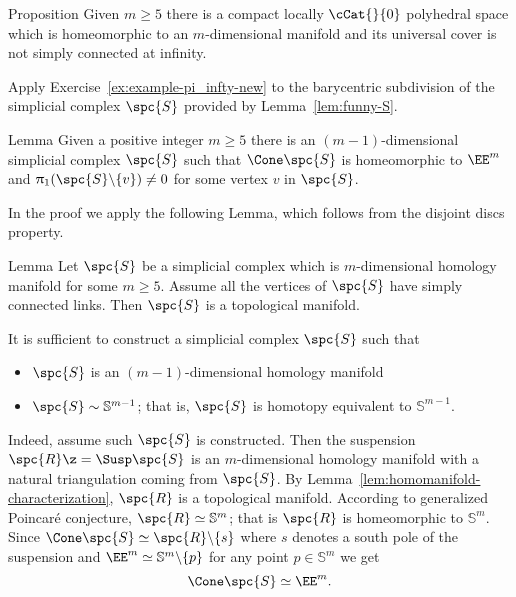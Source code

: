 \begin{thm}{Proposition}\label{prop:loc-CAT-mnfld}
Given $m\ge 5$ there is a compact locally $\cCat{}{0}$ polyhedral space which is homeomorphic to an $m$-dimensional manifold and
its universal cover is not simply connected at infinity.

\end{thm}

Apply Exercise~\ref{ex:example-pi_infty-new} to the barycentric subdivision of the simplicial complex $\spc{S}$ provided by Lemma~\ref{lem:funny-S}.
\qeds

\begin{thm}{Lemma}\label{lem:funny-S}
Given a positive integer $m\ge 5$
there is an $(m-1)$-dimensional simplicial complex $\spc{S}$ such that $\Cone\spc{S}$ is homeomorphic to $\EE^m$
and $\pi_1(\spc{S}\backslash\{v\})\ne0$ for some vertex $v$ in $\spc{S}$.
\end{thm}

In the proof we apply the following Lemma, which follows from the disjoint discs property.

\begin{thm}{Lemma}\label{lem:homomanifold-characterization}
Let $\spc{S}$ be a simplicial complex which 
is $m$-dimensional homology manifold for some $m\ge 5$.
Assume all the vertices of
$\spc{S}$ have simply connected links.
Then $\spc{S}$ is a topological manifold.
\end{thm}


It is sufficient to construct a simplicial complex $\spc{S}$
such that 
\begin{itemize}
\item $\spc{S}$ is an $(m-1)$-dimensional homology manifold 
\item $\spc{S}\sim \mathbb{S}^{m-1}$; that is, $\spc{S}$ is homotopy equivalent to $\mathbb{S}^{m-1}$.
\end{itemize}

Indeed, assume such $\spc{S}$ is constructed.
Then the suspension
$\spc{R}\z=\Susp\spc{S}$
is an $m$-dimensional homology manifold with a natural triangulation coming from $\spc{S}$.
By Lemma~\ref{lem:homomanifold-characterization},
$\spc{R}$ is a topological manifold.
According to generalized Poincar\'{e} conjecture,
$\spc{R}\simeq\mathbb{S}^m$;
that is
$\spc{R}$ is homeomorphic to $\mathbb{S}^m$.
Since $\Cone \spc{S}\simeq \spc{R}\backslash\{s\}$ where $s$ denotes a south pole of the suspension 
and $\EE^m\simeq \mathbb{S}^m\backslash\{p\}$
for any point $p\in \mathbb{S}^m$
we get 
\[\Cone \spc{S}\simeq\EE^m.\]


